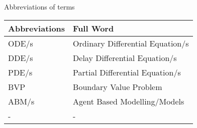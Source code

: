 Abbreviations of terms

\begin{table}[ht!]
    \begin{tabular}{|l|l|}
        \hline
        Abbreviations & Full Word                         \\ \hline
        ODE/s         & Ordinary Differential Equation/s \\ \hline
        DDE/s         & Delay Differential Equation/s \\ \hline
        PDE/s         & Partial Differential Equation/s \\ \hline
        BVP  & Boundary Value Problem \\ \hline
        ABM/s  & Agent Based Modelling/Models \\ \hline
        -  & - \\ \hline
    \end{tabular}
\end{table}
